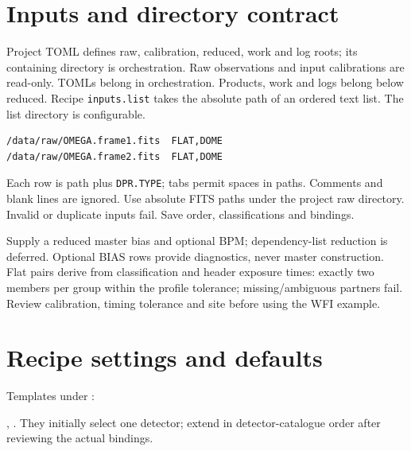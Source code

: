 \documentclass[10pt,a4paper]{article}
\begin{document}
\section*{Inputs and directory contract}
Project TOML defines raw, calibration, reduced, work and log roots; its containing
directory is orchestration. Raw observations and input calibrations are read-only.
TOMLs belong in orchestration. Products, work and logs belong below reduced.
Recipe \texttt{inputs.list} takes the absolute path of an ordered text list.
The list directory is configurable.
\begin{verbatim}
/data/raw/OMEGA.frame1.fits  FLAT,DOME
/data/raw/OMEGA.frame2.fits  FLAT,DOME
\end{verbatim}
Each row is path plus \texttt{DPR.TYPE}; tabs permit spaces in paths. Comments and
blank lines are ignored. Use absolute FITS paths under the project raw directory.
Invalid or duplicate inputs fail. Save order, classifications and bindings.

Supply a reduced master bias and optional BPM; dependency-list reduction is
deferred. Optional BIAS rows provide diagnostics, never master construction.
Flat pairs derive from classification and header exposure times: exactly two
members per group within the profile tolerance; missing/ambiguous partners fail.
Review calibration, timing tolerance and site before using the WFI example.

\newpage
\section*{Recipe settings and defaults}
Templates under :\par
{},
. They initially select one detector; extend
in detector-catalogue order after reviewing the actual bindings.
\end{document}
